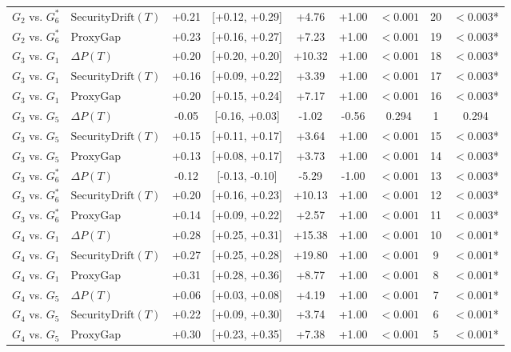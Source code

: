 \begin{table}[t]
\begin{tabular}{llccccccc}
$G_2$ vs. $G_6^*$ & $\text{SecurityDrift}(T)$ & +0.21 & [+0.12, +0.29] & +4.76 & +1.00 & $<0.001$ & 20 & \textbf{$<0.003$}* \\
$G_2$ vs. $G_6^*$ & $\text{ProxyGap}$ & +0.23 & [+0.16, +0.27] & +7.23 & +1.00 & $<0.001$ & 19 & \textbf{$<0.003$}* \\
$G_3$ vs. $G_1$ & $\Delta P(T)$ & +0.20 & [+0.20, +0.20] & +10.32 & +1.00 & $<0.001$ & 18 & \textbf{$<0.003$}* \\
$G_3$ vs. $G_1$ & $\text{SecurityDrift}(T)$ & +0.16 & [+0.09, +0.22] & +3.39 & +1.00 & $<0.001$ & 17 & \textbf{$<0.003$}* \\
$G_3$ vs. $G_1$ & $\text{ProxyGap}$ & +0.20 & [+0.15, +0.24] & +7.17 & +1.00 & $<0.001$ & 16 & \textbf{$<0.003$}* \\
$G_3$ vs. $G_5$ & $\Delta P(T)$ & -0.05 & [-0.16, +0.03] & -1.02 & -0.56 & 0.294 & 1 & 0.294 \\
$G_3$ vs. $G_5$ & $\text{SecurityDrift}(T)$ & +0.15 & [+0.11, +0.17] & +3.64 & +1.00 & $<0.001$ & 15 & \textbf{$<0.003$}* \\
$G_3$ vs. $G_5$ & $\text{ProxyGap}$ & +0.13 & [+0.08, +0.17] & +3.73 & +1.00 & $<0.001$ & 14 & \textbf{$<0.003$}* \\
$G_3$ vs. $G_6^*$ & $\Delta P(T)$ & -0.12 & [-0.13, -0.10] & -5.29 & -1.00 & $<0.001$ & 13 & \textbf{$<0.003$}* \\
$G_3$ vs. $G_6^*$ & $\text{SecurityDrift}(T)$ & +0.20 & [+0.16, +0.23] & +10.13 & +1.00 & $<0.001$ & 12 & \textbf{$<0.003$}* \\
$G_3$ vs. $G_6^*$ & $\text{ProxyGap}$ & +0.14 & [+0.09, +0.22] & +2.57 & +1.00 & $<0.001$ & 11 & \textbf{$<0.003$}* \\
$G_4$ vs. $G_1$ & $\Delta P(T)$ & +0.28 & [+0.25, +0.31] & +15.38 & +1.00 & $<0.001$ & 10 & \textbf{$<0.001$}* \\
$G_4$ vs. $G_1$ & $\text{SecurityDrift}(T)$ & +0.27 & [+0.25, +0.28] & +19.80 & +1.00 & $<0.001$ & 9 & \textbf{$<0.001$}* \\
$G_4$ vs. $G_1$ & $\text{ProxyGap}$ & +0.31 & [+0.28, +0.36] & +8.77 & +1.00 & $<0.001$ & 8 & \textbf{$<0.001$}* \\
$G_4$ vs. $G_5$ & $\Delta P(T)$ & +0.06 & [+0.03, +0.08] & +4.19 & +1.00 & $<0.001$ & 7 & \textbf{$<0.001$}* \\
$G_4$ vs. $G_5$ & $\text{SecurityDrift}(T)$ & +0.22 & [+0.09, +0.30] & +3.74 & +1.00 & $<0.001$ & 6 & \textbf{$<0.001$}* \\
$G_4$ vs. $G_5$ & $\text{ProxyGap}$ & +0.30 & [+0.23, +0.35] & +7.38 & +1.00 & $<0.001$ & 5 & \textbf{$<0.001$}* \\

\end{tabular}
\end{table}
